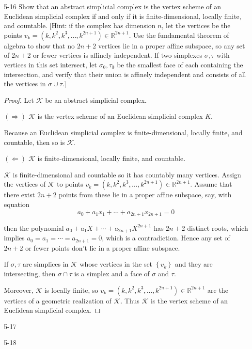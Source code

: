 \begin{problem}{5-16}\label{problem:5-16}
Show that an abstract simplicial complex is the vertex scheme of an Euclidean simplicial complex if and only if it is finite-dimensional, locally finite, and countable. [Hint: if the complex has dimension \(n\), let the vertices be the points \( v_k = (k, k^2, k^3, \dots, k^{2n+1}) \in \mathbb{R}^{2n+1} \). Use the fundamental theorem of algebra to show that no \( 2n+2 \) vertices lie in a proper affine subspace, so any set of \( 2n+2 \) or fewer vertices is affinely independent. If two simplexes \( \sigma, \tau \) with vertices in this set intersect, let \( \sigma_{0}, \tau_{0} \) be the smallest face of each containing the intersection, and verify that their union is affinely independent and consists of all the vertices in \( \sigma \cup \tau \).]
\end{problem}

\begin{proof}
	Let \( \mathcal{K} \) be an abstract simplicial complex.

	\( (\Longrightarrow) \) \( \mathcal{K} \) is the vertex scheme of an Euclidean simplicial complex \( K \).

	Because an Euclidean simplicial complex is finite-dimensional, locally finite, and countable, then so is \( \mathcal{K} \).

	\( (\Longleftarrow) \) \( \mathcal{K} \) is finite-dimensional, locally finite, and countable.

	\( \mathcal{K} \) is finite-dimensional and countable so it has countably many vertices. Assign the vertices of \( \mathcal{K} \) to points \( v_{k} = (k, k^{2}, k^{3}, \ldots, k^{2n+1}) \in \mathbb{R}^{2n+1} \). Assume that there exist \( 2n + 2 \) points from these lie in a proper affine subspace, say, with equation
	\[
		a_{0} + a_{1}x_{1} + \cdots + a_{2n+1}x_{2n+1} = 0
	\]

	then the polynomial \( a_{0} + a_{1}X + \cdots + a_{2n+1}X^{2n+1} \) has \( 2n + 2 \) distinct roots, which implies \( a_{0} = a_{1} = \cdots = a_{2n+1} = 0 \), which is a contradiction. Hence any set of \( 2n + 2 \) or fewer points don't lie in a proper affine subspace.

	If \( \sigma, \tau \) are simplices in \( \mathcal{K} \) whose vertices in the set \( \left\{ v_{k} \right\} \) and they are intersecting, then \( \sigma \cap \tau \) is a simplex and a face of \( \sigma \) and \( \tau \).

	Moreover, \( \mathcal{K} \) is locally finite, so \( v_{k} = (k, k^{2}, k^{3}, \ldots, k^{2n+1}) \in \mathbb{R}^{2n+1} \) are the vertices of a geometric realization of \( \mathcal{K} \). Thus \( \mathcal{K} \) is the vertex scheme of an Euclidean simplicial complex.
\end{proof}

\begin{problem}{5-17}\label{problem:5-17}
\end{problem}

\begin{problem}{5-18}\label{problem:5-18}
\end{problem}
